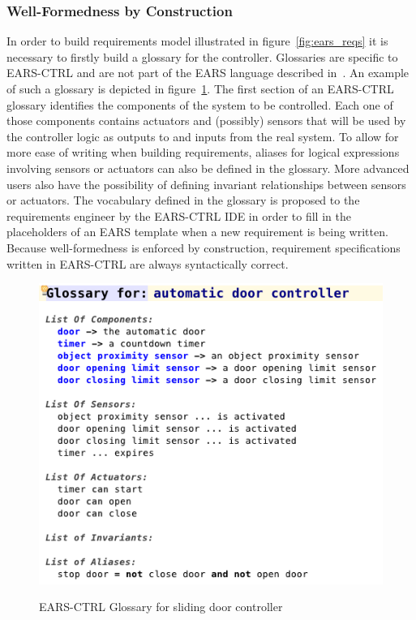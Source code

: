 \subsubsection{Well-Formedness by Construction}
\vspace{-0cm}In order to build requirements model illustrated in
figure~\ref{fig:ears_reqs} it is necessary to firstly build a glossary
for the controller. Glossaries are specific to \textsf{EARS-CTRL} and are not
part of the EARS language described in~\cite{EARS09}. An example of such a
glossary is depicted in figure~\ref{fig:ears_glossary}. The first section of an \textsf{EARS-CTRL} glossary identifies the components of the system to be controlled. Each one of
those components contains actuators and (possibly) sensors that will be used by
the controller logic as outputs to and inputs from the real system. To allow
for more ease of writing when building requirements, aliases for logical expressions
involving sensors or actuators can also be defined in the glossary. More
advanced users also have the possibility of defining invariant relationships
between sensors or actuators.
The vocabulary defined in the glossary is proposed to the requirements engineer
by the \textsf{EARS-CTRL} IDE in order to fill in the placeholders of an EARS
template when a new requirement is being written. Because well-formedness is
enforced by construction, requirement specifications written in
\textsf{EARS-CTRL} are always syntactically correct.\vspace{-.6cm}
\begin{figure}[h!]
   \begin{center}
     \includegraphics[width=.5\textwidth]{images/glossary.png}
     \caption{\textsf{EARS-CTRL} Glossary for sliding door
     controller}
     \vspace{-.3cm}
     \label{fig:ears_glossary}
   \end{center}
   \vspace{-1.4cm}
 \end{figure} 
